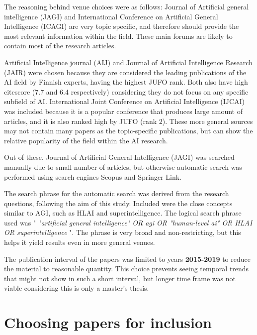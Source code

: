 \documentclass[utf8,english]{gradu3}
\begin{document}
The reasoning behind venue choices were as follows: Journal of Artificial
general intelligence (JAGI) and International Conference on
Artificial General Intelligence (ICAGI) are very topic specific, and therefore
should provide the most relevant information within the field. These main forums
are likely to contain most of the research articles. 

Artificial Intelligence journal (AIJ) and Journal of Artificial Intelligence
Research (JAIR) were chosen because they are considered the leading publications
of the AI field by Finnish experts, having the highest JUFO rank. Both also have
high citescore (7.7 and 6.4 respectively) considering they do not focus on any
specific subfield of AI. International Joint Conference on Artificial
Intelligence (IJCAI) was included because it is a popular conference that
produces large amount of articles, and it is also ranked high by JUFO (rank 2).
These more general sources may not contain many papers as the topic-specific
publications, but can show the relative popularity of the field within the AI
research.


Out of these, Journal of Artificial General
Intelligence (JAGI) was searched manually due to small number of articles, but
otherwise automatic search was performed using search engines Scopus and
Springer Link.

The search phrase for the automatic search was derived from the research
questions, following the aim of this study. Included were the close concepts
similar to AGI, such as HLAI and superintelligence. The logical search phrase
used was " \emph{"artificial general intelligence" OR agi OR "human-level ai" OR
HLAI OR superintelligence} ". The phrase is very broad and non-restricting, but
this helps it yield results even in more general venues.

The publication interval of the papers was limited to years \textbf{2015-2019}
to reduce the material to reasonable quantity. This choice prevents seeing
temporal trends that might not show in such a short interval, but longer time
frame was not viable considering this is only a master's thesis.

\section{Choosing papers for inclusion}
\end{document}
